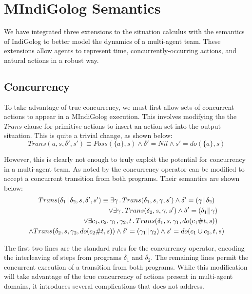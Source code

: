\section{MIndiGolog Semantics\label{sec:MIndiGolog:Semantics}}

We have integrated three extensions to the situation calculus with
the semantics of IndiGolog to better model the dynamics of a multi-agent
team. These extensions allow agents to represent time, concurrently-occurring
actions, and natural actions in a robust way.


\subsection{Concurrency}

To take advantage of true concurrency, we must first allow sets of
concurrent actions to appear in a MIndiGolog execution. This involves
modifying the the $Trans$ clause for primitive actions to insert
an action set into the output situation. This is quite a trivial change,
as shown below:\[
Trans(a,s,\delta',s')\equiv Poss(\{a\},s)\wedge\delta'=Nil\wedge s'=do(\{a\},s)\]


However, this is clearly not enough to truly exploit the potential
for concurrency in a multi-agent team. As noted by \citep{pinto99tcongolog}
the concurrency operator can be modified to accept a concurrent transition
from both programs. Their semantics are shown below:\begin{multline*}
Trans(\delta_{1}||\delta_{2},s,\delta',s')\equiv\exists\gamma\,.\, Trans(\delta_{1},s,\gamma,s')\wedge\delta'=(\gamma||\delta_{2})\\
\shoveright{\vee\exists\gamma\,.\, Trans(\delta_{2},s,\gamma,s')\wedge\delta'=(\delta_{1}||\gamma)}\\
\shoveright{\vee\exists c_{1},c_{2},\gamma_{1},\gamma_{2},t\,.\, Trans(\delta_{1},s,\gamma_{1},do(c_{1}\#t,s))}\\
\wedge Trans(\delta_{2},s,\gamma_{2},do(c_{2}\#t,s))\wedge\delta'=(\gamma_{1}||\gamma_{2})\wedge s'=do(c_{1}\cup c_{2},t,s)\end{multline*}


The first two lines are the standard rules for the concurrency operator,
encoding the interleaving of steps from programs $\delta_{1}$ and
$\delta_{2}$. The remaining lines permit the concurrent execution
of a transition from both programs. While this modification will take
advantage of the true concurrency of actions present in multi-agent
domains, it introduces several complications that \citep{pinto99tcongolog}
does not address.

